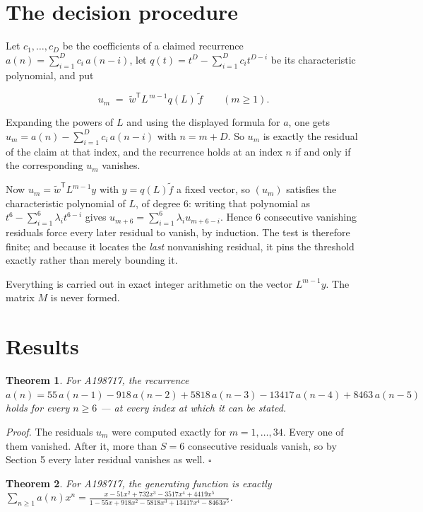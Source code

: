 \documentclass[11pt]{article}
\newtheorem{theorem}{Theorem}
\theoremstyle{definition}
\begin{document}
\section{The decision procedure}

Let $c_1,\dots,c_D$ be the coefficients of a claimed recurrence $a(n) = \sum_{i=1}^{D} c_i\,a(n-i)$, let $q(t) = t^{D} - \sum_{i=1}^{D} c_i t^{D-i}$ be its characteristic polynomial, and put

\[u_m \;=\; \tilde w^{\mathsf T} L^{\,m-1} q(L)\,\tilde f \qquad (m \ge 1).\]

Expanding the powers of $L$ and using the displayed formula for $a$, one gets $u_m = a(n) - \sum_{i=1}^{D} c_i\,a(n-i)$ with $n = m + D$. So $u_m$ is exactly the residual of the claim at that index, and the recurrence holds at an index $n$ if and only if the corresponding $u_m$ vanishes.

Now $u_m = \tilde w^{\mathsf T} L^{m-1} y$ with $y = q(L)\tilde f$ a fixed vector, so $(u_m)$ satisfies the characteristic polynomial of $L$, of degree $6$: writing that polynomial as $t^{6} - \sum_{i=1}^{6} \lambda_i t^{6-i}$ gives $u_{m+6} = \sum_{i=1}^{6} \lambda_i u_{m+6-i}$. Hence $6$ consecutive vanishing residuals force every later residual to vanish, by induction. The test is therefore finite; and because it locates the {\itshape last} nonvanishing residual, it pins the threshold exactly rather than merely bounding it.

Everything is carried out in exact integer arithmetic on the vector $L^{m-1}y$. The matrix $M$ is never formed.

\section{Results}

\begin{theorem} For A198717, the recurrence $a(n) = 55\,a(n-1) - 918\,a(n-2) + 5818\,a(n-3) - 13417\,a(n-4) + 8463\,a(n-5)$ holds for every $n \ge 6$ --- at every index at which it can be stated.\end{theorem}

{\itshape Proof.} The residuals $u_m$ were computed exactly for $m = 1,\dots,34$. Every one of them vanished. After it, more than $S = 6$ consecutive residuals vanish, so by Section 5 every later residual vanishes as well. $\square$

\begin{theorem} For A198717, the generating function is exactly $\sum_{n\ge 1} a(n)x^n = \frac{x - 51x^{2} + 732x^{3} - 3517x^{4} + 4419x^{5}}{1 - 55x + 918x^{2} - 5818x^{3} + 13417x^{4} - 8463x^{5}}$.\end{theorem}
\end{document}
